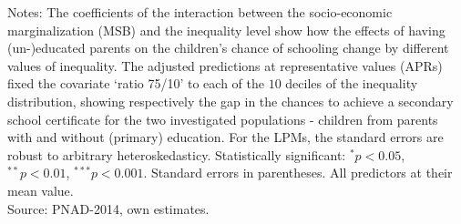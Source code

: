 \documentclass[a4paper, 12pt]{article}
\begin{document}
\begin{table}[H]
\begin{adjustbox}{max width=\textwidth}
\begin{tabular}{llllllllllllllll}
     \midrule
     \end{tabular}%
     \end{adjustbox}
   \begin{minipage}{1\textwidth} \tiny Notes: The coefficients of the interaction between the socio-economic marginalization (MSB) and the inequality level show how the effects of having (un-)educated parents on the children's chance of schooling change by different values of inequality. The adjusted predictions at representative values (APRs) fixed the covariate ‘ratio 75/10’ to each of the $10$ deciles of the inequality distribution, showing respectively the gap in the chances to achieve a secondary school certificate for the two investigated populations - children from parents with and without (primary) education. For the LPMs, the standard errors are robust to arbitrary heteroskedasticy. Statistically significant: $^{*}p<0.05$, $^{**}p<0.01$, $^{***}p<0.001$. Standard errors in parentheses. All predictors at their mean value. \\ Source: PNAD-2014, own estimates.
    \end{minipage}
    \label{tab:Rob.Checks}%
   \end{table}%
\end{document}
